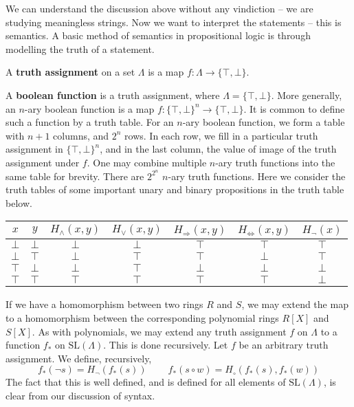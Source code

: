 We can understand the discussion above without any vindiction -- we are studying meaningless strings. Now we want to interpret the statements -- this is semantics. A basic method of semantics in propositional logic is through modelling the truth of a statement.

\begin{definition}
    A {\bf truth assignment} on a set $\Lambda$ is a map $f: \Lambda \to \{ \top, \bot \}$.
\end{definition}

\begin{example}
    A {\bf boolean function} is a truth assignment, where $\Lambda = \{ \top, \bot \}$. More generally, an $n$-ary boolean function is a map $f: \{ \top, \bot \}^n \to \{ \top, \bot \}$. It is common to define such a function by a truth table. For an $n$-ary boolean function, we form a table with $n + 1$ columns, and $2^{n}$ rows. In each row, we fill in a particular truth assignment in $\{ \top, \bot \}^n$, and in the last column, the value of image of the truth assignment under $f$. One may combine multiple $n$-ary truth functions into the same table for brevity. There are $2^{2^{n}}$ $n$-ary truth functions. Here we consider the truth tables of some important unary and binary propositions in the truth table below.
    \begin{center}
    \begin{tabular}{| c | c | c | c | c | c | c |}
        \hline $x$ & $y$ & $H_\wedge(x,y)$ & $H_\vee(x,y)$ & $H_\Rightarrow(x,y)$ & $H_\Leftrightarrow(x,y)$ & $H_\neg(x)$ \\
        \hline $\bot$ & $\bot$ & $\bot$ & $\bot$ & $\top$ & $\top$ & $\top$ \\
        $\bot$ & $\top$ & $\bot$ & $\top$ & $\top$ & $\bot$ & $\top$ \\
        $\top$ & $\bot$ & $\bot$ & $\top$ & $\bot$ & $\bot$ & $\bot$ \\
        $\top$ & $\top$ & $\top$ & $\top$ & $\top$ & $\top$ & $\bot$ \\
        \hline
    \end{tabular}
    \end{center}
\end{example}

If we have a homomorphism between two rings $R$ and $S$, we may extend the map to a homomorphism between the corresponding polynomial rings $R[X]$ and $S[X]$. As with polynomials, we may extend any truth assignment $f$ on $\Lambda$ to a function $f_*$ on $\text{SL}(\Lambda)$. This is done recursively. Let $f$ be an arbitrary truth assignment. We define, recursively,
%
\[ f_*(\neg s) = H_\neg(f_*(s))\ \ \ \ \ \ \ \ \ \ f_*(s \circ w) = H_\circ(f_*(s), f_*(w)) \]
%
The fact that this is well defined, and is defined for all elements of $\text{SL}(\Lambda)$, is clear from our discussion of syntax.

